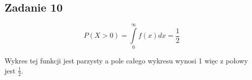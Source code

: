 \subsection{Zadanie 10}
$$P(X>0)=\int\limits_{0}^{\infty}f(x)dx=\frac{1}{2}$$

Wykres tej funkcji jest parzysty a pole całego wykresu wynosi 1 
więc z połowy jest $\frac{1}{2}$.